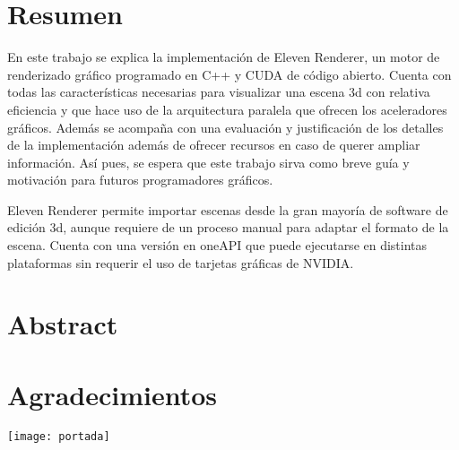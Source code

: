 \chapter*{Resumen}

En este trabajo se explica la implementación de Eleven Renderer, un motor de renderizado gráfico programado en C++ y CUDA de código abierto. Cuenta con todas las características necesarias para visualizar una escena 3d con relativa eficiencia y que hace uso de la arquitectura paralela que ofrecen los aceleradores gráficos. Además se acompaña con una evaluación y justificación de los detalles de la implementación además de ofrecer recursos en caso de querer ampliar información. Así pues, se espera que este trabajo sirva como breve guía y motivación para futuros programadores gráficos.

Eleven Renderer permite importar escenas desde la gran mayoría de software de edición 3d, aunque requiere de un proceso manual para adaptar el formato de la escena. Cuenta con una versión en oneAPI que puede ejecutarse en distintas plataformas sin requerir el uso de tarjetas gráficas de NVIDIA.


\chapter*{Abstract}


\chapter*{Agradecimientos}


\newpage

\texttt{[image: portada]}

\scalebox{5}{\color{white}{Eleven Renderer}}

